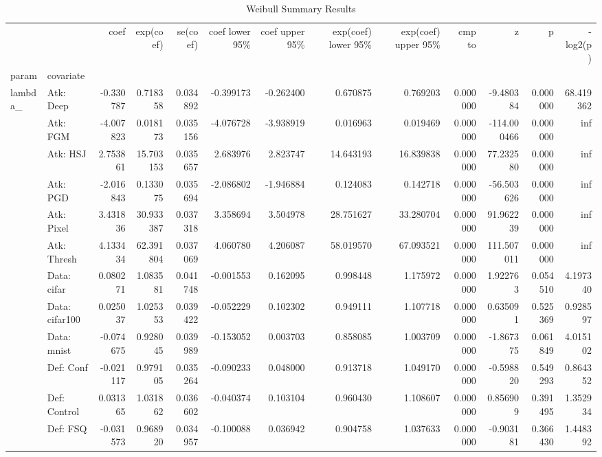 \begin{table}[htbp]
\caption{Weibull Summary Results}
\label{tab:weibull_summary}
\begin{tabular}{llrrrrrrrrrrr}
\toprule
 &  & coef & exp(coef) & se(coef) & coef lower 95\% & coef upper 95\% & exp(coef) lower 95\% & exp(coef) upper 95\% & cmp to & z & p & -log2(p) \\
param & covariate &  &  &  &  &  &  &  &  &  &  &  \\
\midrule
\multirow[t]{23}{*}{lambda\_} & Atk: Deep & -0.330787 & 0.718358 & 0.034892 & -0.399173 & -0.262400 & 0.670875 & 0.769203 & 0.000000 & -9.480384 & 0.000000 & 68.419362 \\
 & Atk: FGM & -4.007823 & 0.018173 & 0.035156 & -4.076728 & -3.938919 & 0.016963 & 0.019469 & 0.000000 & -114.000466 & 0.000000 & inf \\
 & Atk: HSJ & 2.753861 & 15.703153 & 0.035657 & 2.683976 & 2.823747 & 14.643193 & 16.839838 & 0.000000 & 77.232580 & 0.000000 & inf \\
 & Atk: PGD & -2.016843 & 0.133075 & 0.035694 & -2.086802 & -1.946884 & 0.124083 & 0.142718 & 0.000000 & -56.503626 & 0.000000 & inf \\
 & Atk: Pixel & 3.431836 & 30.933387 & 0.037318 & 3.358694 & 3.504978 & 28.751627 & 33.280704 & 0.000000 & 91.962239 & 0.000000 & inf \\
 & Atk: Thresh & 4.133434 & 62.391804 & 0.037069 & 4.060780 & 4.206087 & 58.019570 & 67.093521 & 0.000000 & 111.507011 & 0.000000 & inf \\
 & Data: cifar & 0.080271 & 1.083581 & 0.041748 & -0.001553 & 0.162095 & 0.998448 & 1.175972 & 0.000000 & 1.922763 & 0.054510 & 4.197340 \\
 & Data: cifar100 & 0.025037 & 1.025353 & 0.039422 & -0.052229 & 0.102302 & 0.949111 & 1.107718 & 0.000000 & 0.635091 & 0.525369 & 0.928597 \\
 & Data: mnist & -0.074675 & 0.928045 & 0.039989 & -0.153052 & 0.003703 & 0.858085 & 1.003709 & 0.000000 & -1.867375 & 0.061849 & 4.015102 \\
 & Def: Conf & -0.021117 & 0.979105 & 0.035264 & -0.090233 & 0.048000 & 0.913718 & 1.049170 & 0.000000 & -0.598820 & 0.549293 & 0.864352 \\
 & Def: Control & 0.031365 & 1.031862 & 0.036602 & -0.040374 & 0.103104 & 0.960430 & 1.108607 & 0.000000 & 0.856909 & 0.391495 & 1.352934 \\
 & Def: FSQ & -0.031573 & 0.968920 & 0.034957 & -0.100088 & 0.036942 & 0.904758 & 1.037633 & 0.000000 & -0.903181 & 0.366430 & 1.448392 \\

\end{tabular}
\end{table}
